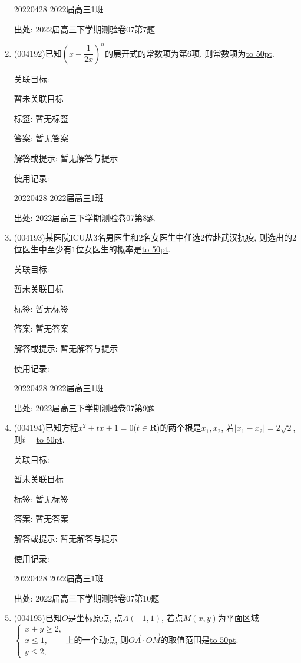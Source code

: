 \documentclass[10pt,a4paper]{article}
\newcommand{\blank}[1]{\underline{\hbox to #1pt{}}}
\begin{document}
\begin{enumerate}[1.]
20220428	2022届高三1班	


出处: 2022届高三下学期测验卷07第7题
\item { (004192)}已知$(x-\dfrac 1{2x})^n$的展开式的常数项为第$6$项, 则常数项为\blank{50}.


关联目标:

暂未关联目标



标签: 暂无标签

答案: 暂无答案

解答或提示: 暂无解答与提示

使用记录:

20220428	2022届高三1班	


出处: 2022届高三下学期测验卷07第8题
\item { (004193)}某医院ICU从$3$名男医生和$2$名女医生中任选$2$位赴武汉抗疫, 则选出的$2$位医生中至少有$1$位女医生的概率是\blank{50}.


关联目标:

暂未关联目标



标签: 暂无标签

答案: 暂无答案

解答或提示: 暂无解答与提示

使用记录:

20220428	2022届高三1班	


出处: 2022届高三下学期测验卷07第9题
\item { (004194)}已知方程$x^2+tx+1=0$($t\in \mathbf{R}$)的两个根是$x_1,x_2$, 若$|x_1-x_2|=2\sqrt 2$, 则$t=$\blank{50}.


关联目标:

暂未关联目标



标签: 暂无标签

答案: 暂无答案

解答或提示: 暂无解答与提示

使用记录:

20220428	2022届高三1班	


出处: 2022届高三下学期测验卷07第10题
\item { (004195)}已知$O$是坐标原点, 点$A(-1,1)$, 若点$M(x,y)$为平面区域$\begin{cases} x+y\ge 2, \\ x\le 1, \\ y\le 2, \end{cases}$上的一个动点, 则$\overrightarrow{OA}\cdot \overrightarrow{OM}$的取值范围是\blank{50}.



\end{enumerate}
\end{document}
